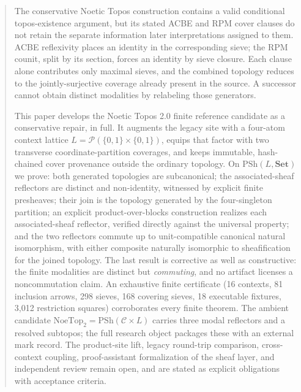 \documentclass[11pt]{amsart}
\theoremstyle{definition}
\theoremstyle{remark}
\newcommand{\PSh}{\mathrm{PSh}}
\newcommand{\Set}{\mathbf{Set}}
\newcommand{\cC}{\mathcal{C}}
\begin{document}
\begin{abstract}
The conservative Noetic Topos construction contains a valid conditional topos-existence argument, but its stated ACBE and RPM cover clauses do not retain the separate information later interpretations assigned to them. ACBE reflexivity places an identity in the corresponding sieve; the RPM counit, split by its section, forces an identity by sieve closure. Each clause alone contributes only maximal sieves, and the combined topology reduces to the jointly-surjective coverage already present in the source. A successor cannot obtain distinct modalities by relabeling those generators.

This paper develops the Noetic Topos 2.0 finite reference candidate as a conservative repair, in full. It augments the legacy site with a four-atom context lattice $L=\mathcal{P}(\{0,1\}\times\{0,1\})$, equips that factor with two transverse coordinate-partition coverages, and keeps immutable, hash-chained cover provenance outside the ordinary topology. On $\PSh(L,\Set)$ we prove: both generated topologies are subcanonical; the associated-sheaf reflectors are distinct and non-identity, witnessed by explicit finite presheaves; their join is the topology generated by the four-singleton partition; an explicit product-over-blocks construction realizes each associated-sheaf reflector, verified directly against the universal property; and the two reflectors commute up to unit-compatible canonical natural isomorphism, with either composite naturally isomorphic to sheafification for the joined topology. The last result is corrective as well as constructive: the finite modalities are distinct but \emph{commuting}, and no artifact licenses a noncommutation claim. An exhaustive finite certificate (16 contexts, 81 inclusion arrows, 298 sieves, 168 covering sieves, 18 executable fixtures, 3{,}012 restriction squares) corroborates every finite theorem. The ambient candidate $\mathrm{NoeTop}_2=\PSh(\cC\times L)$ carries three modal reflectors and a resolved subtopos; the full research object packages these with an external mark record. The product-site lift, legacy round-trip comparison, cross-context coupling, proof-assistant formalization of the sheaf layer, and independent review remain open, and are stated as explicit obligations with acceptance criteria.
\end{abstract}

\maketitle
\tableofcontents
\end{document}
